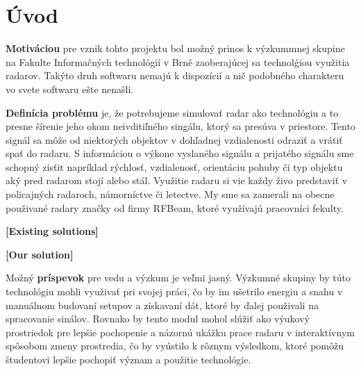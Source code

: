 \documentclass[slovak]{ExcelAtFIT} %
\affiliation{*%
  \href{mailto:xormos00@stud..vutbr.cz}{xormos00@stud..vutbr.cz},
  \textit{Fakulta informačních Technologií, Vysoké učení technické v Brně}}
\begin{document}
\startdocument



\section{Úvod}
\label{sec:Intorduction}
\hspace{0.6cm}\textbf{Motiváciou} pre vznik tohto projektu bol možný prinos k výzkummnej skupine na Fakulte Informačných technológií v Brně zaoberajúcej sa technolǵiou využitia radarov. Takýto druh softwaru nemajú k dispozícií a nič podobného charakteru vo svete softwaru ešte nenašli.

\textbf{Definícia problému} je, že potrebujeme simulovať radar ako technológiu a to presne šírenie jeho okom neivditiľného singálu, ktorý sa presúva v priestore. Tento signál sa môže od niektorých objektov v dohľadnej vzdialenosti odraziť a vrátiť spať do radaru. S informáciou o výkone vyslaného signálu a prijatého signálu sme schopný zisťit napríklad rýchlosť, vzdialenosť, orientáciu pohuby či typ objektu aký pred radarom stojí alebo stál.
Využitie radaru si vie každy živo predstaviť v policajných radaroch, námorníctve či letectve.
My sme sa zamerali na obecne použivané radary značky od firmy RFBeam, ktoré využívajú pracovníci fekulty.

\textbf{[Existing solutions]} 

\textbf{[Our solution]}

Možný \textbf{príspevok} pre vedu a výzkum je veľmi jasný. Výzkumné skupiny by túto technológiu mohli využivať pri svojej práci, čo by im ušetrilo energiu a snahu v manuálnom budovaní setupov a získavaní dát, ktoré by ďalej použivali na spracovanie sinálov. Rovnako by tento modul mohol slúžiť ako výukový prostriedok pre lepšie pochopenie a názornú ukážku prace radaru v interaktívnym spôsobom zmeny prostredia, čo by vyústilo k rôznym výsledkom, ktoré pomôžu študentovi lepšie pochopiť význam a použitie technológie.

\end{document}
